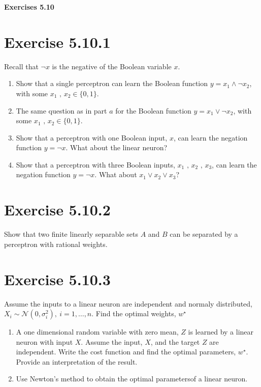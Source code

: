 \documentclass{exam}
\begin{document}
\begin{center}
    \textbf{\Large Exercises 5.10 }
\end{center}

\section*{Exercise 5.10.1}
Recall that $\neg x$ is the negative of the Boolean variable $x$. 
\begin{enumerate}
    \item Show that a single perceptron can learn the Boolean function $y = x_{1}\land \neg x_{2}$, with some $x_{1} \text{ , } x_{2} \in \{0,1\}$.
    \item The same question as in part $a$ for the Boolean function $y = x_{1}\lor \neg x_{2}$, with some $x_{1} \text{ , } x_{2} \in \{0,1\}$.
    \item Show that a perceptron with one Boolean input, $x$, can learn the negation function $y = \neg x$. What about the linear neuron?
    \item Show that a perceptron with three Boolean inputs, $x_{1} \text{ , } x_{2} \text{ , } x_3$, can learn the negation function $y = \neg x$. What about $x_1 \lor x_2 \lor x_3$?
\end{enumerate}

\section*{Exercise 5.10.2}
Show that two finite linearly separable sets $A$ and $B$ can be separated by a perceptron with rational weights. 

\section*{Exercise 5.10.3}
Assume the inputs to a linear neuron are independent and normaly distributed, $X_{i} \sim \mathcal{N}(0, \sigma^{2}_{i}), \ i = 1, \ldots , n$. Find the 
optimal weights, $w^{\star}$
\begin{enumerate}
   \item A one dimensional random variable with zero mean, $Z$ is learned by a linear neuron with input $X$. Assume the input, $X$, and the target $Z$
   are independent. Write the cost function and find the optimal parameters, $w^{\star}$. Provide an interpretation of the result.
   \item Use Newton's method to obtain the optimal parametersof a linear neuron.
\end{enumerate}  
\end{document}
